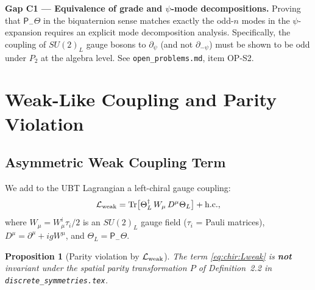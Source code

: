 \documentclass[12pt,a4paper]{article}
\newtheorem{proposition}[theorem]{Proposition}
\theoremstyle{definition}
\theoremstyle{remark}
\begin{document}
\begin{gapbox}
\textbf{Gap C1 --- Equivalence of grade and $\psi$-mode decompositions.}
Proving that $\mathsf{P}_-\Theta$ in the biquaternion sense matches exactly the
odd-$n$ modes in the $\psi$-expansion requires an explicit mode decomposition
analysis.  Specifically, the coupling of $SU(2)_L$ gauge bosons to $\partial_\psi$
(and not $\partial_{-\psi}$) must be shown to be odd under $P_2$ at the algebra
level.  See \texttt{open\_problems.md}, item OP-S2.
\end{gapbox}

\section{Weak-Like Coupling and Parity Violation}
\label{sec:chir:weak}

\subsection{Asymmetric Weak Coupling Term}

We add to the UBT Lagrangian a left-chiral gauge coupling:
\begin{equation}
  \mathcal{L}_{\rm weak}
  = \mathrm{Tr}\bigl[\Theta_L^\dagger\, W_\mu\, D^\mu\Theta_L\bigr]
  + \mathrm{h.c.},
  \label{eq:chir:Lweak}
\end{equation}
where $W_\mu = W_\mu^i \tau_i/2$ is an $SU(2)_L$ gauge field
($\tau_i$ = Pauli matrices), $D^\mu = \partial^\mu + igW^\mu$, and
$\Theta_L = \mathsf{P}_-\Theta$.

\begin{proposition}[Parity violation by $\mathcal{L}_{\rm weak}$]
\label{prop:chir:P_violation}
The term \eqref{eq:chir:Lweak} is \textbf{not} invariant under the spatial
parity transformation $P$ of Definition~2.2 in \texttt{discrete\_symmetries.tex}.
\end{proposition}
\end{document}
